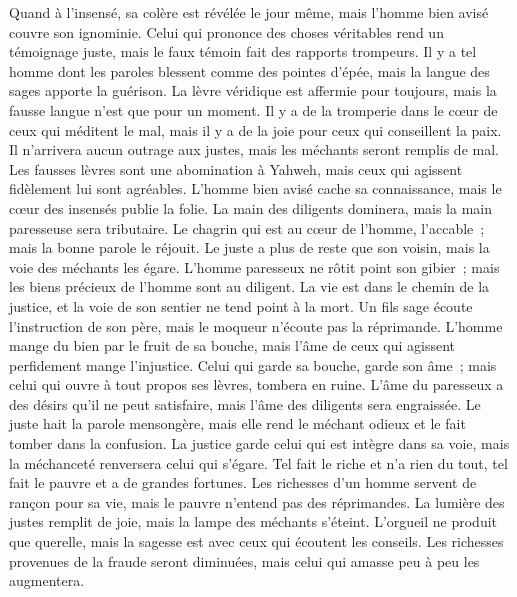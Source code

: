 \begin{multicols}{2}
Quand à l'insensé, sa colère est révélée le jour même, mais l'homme bien avisé couvre son ignominie.
Celui qui prononce des choses véritables rend un témoignage juste, mais le faux témoin fait des rapports trompeurs.
Il y a tel homme dont les paroles blessent comme des pointes d'épée, mais la langue des sages apporte la guérison.
La lèvre véridique est affermie pour toujours, mais la fausse langue n'est que pour un moment.
Il y a de la tromperie dans le cœur de ceux qui méditent le mal, mais il y a de la joie pour ceux qui conseillent la paix.
Il n'arrivera aucun outrage aux justes, mais les méchants seront remplis de mal.
Les fausses lèvres sont une abomination à Yahweh, mais ceux qui agissent fidèlement lui sont agréables.
L'homme bien avisé cache sa connaissance, mais le cœur des insensés publie la folie.
La main des diligents dominera, mais la main paresseuse sera tributaire.
Le chagrin qui est au cœur de l'homme, l'accable~; mais la bonne parole le réjouit.
Le juste a plus de reste que son voisin, mais la voie des méchants les égare.
L'homme paresseux ne rôtit point son gibier~; mais les biens précieux de l'homme sont au diligent.
La vie est dans le chemin de la justice, et la voie de son sentier ne tend point à la mort.
\VerseOne{}Un fils sage écoute l'instruction de son père, mais le moqueur n'écoute pas la réprimande.
L'homme mange du bien par le fruit de sa bouche, mais l'âme de ceux qui agissent perfidement mange l'injustice.
Celui qui garde sa bouche, garde son âme~; mais celui qui ouvre à tout propos ses lèvres, tombera en ruine.
L'âme du paresseux a des désirs qu'il ne peut satisfaire, mais l'âme des diligents sera engraissée.
Le juste hait la parole mensongère, mais elle rend le méchant odieux et le fait tomber dans la confusion.
La justice garde celui qui est intègre dans sa voie, mais la méchanceté renversera celui qui s'égare.
Tel fait le riche et n'a rien du tout, tel fait le pauvre et a de grandes fortunes.
Les richesses d'un homme servent de rançon pour sa vie, mais le pauvre n'entend pas des réprimandes.
La lumière des justes remplit de joie, mais la lampe des méchants s'éteint.
L'orgueil ne produit que querelle, mais la sagesse est avec ceux qui écoutent les conseils.
Les richesses provenues de la fraude seront diminuées, mais celui qui amasse peu à peu les augmentera.

\end{multicols}
